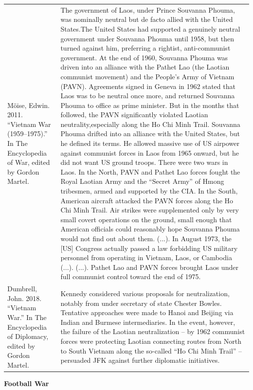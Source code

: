 {\begin{longtable}{p{}p{}}
\\
Möise, Edwin. 2011. “Vietnam War (1959–1975).” In The Encyclopedia of War, edited by Gordon Martel. & The government of Laos, under Prince Souvanna Phouma, was nominally neutral but de facto allied with the United States.The United States had supported a genuinely neutral government under Souvanna Phouma until 1958, but then turned against him, preferring a rightist, anti-communist government. At the end of 1960, Souvanna Phouma was driven into an alliance with the Pathet Lao (the Laotian communist movement) and the People's Army of Vietnam (PAVN). Agreements signed in Geneva in 1962 stated that Laos was to be neutral once more, and returned Souvanna Phouma to office as prime minister. But in the months that followed, the PAVN significantly violated Laotian neutrality,especially along the Ho Chi Minh Trail. Souvanna Phouma drifted into an alliance with the United States, but he defined its terms. He allowed massive use of US airpower against communist forces in Laos from 1965 onward, but he did not want US ground troops.
There were two wars in Laos. In the North, PAVN and Pathet Lao forces fought the Royal Laotian Army and the “Secret Army” of Hmong tribesmen, armed and supported by the CIA. In the South, American aircraft attacked the PAVN forces along the Ho Chi Minh Trail. Air strikes were supplemented only by very small covert operations on the ground, small enough that American officials could reasonably hope Souvanna Phouma would not find out about them. (...).
In August 1973, the [US] Congress actually passed a law forbidding US military personnel from operating in Vietnam, Laos, or Cambodia (...). (...).
Pathet Lao and PAVN forces brought Laos under full communist control toward the end of 1975.

\\
Dumbrell, John. 2018. “Vietnam War.” In The Encyclopedia of Diplomacy, edited by Gordon Martel. & Kennedy considered various proposals for neutralization, notably from under secretary of state Chester Bowles. Tentative approaches were made to Hanoi and Beijing via Indian and Burmese intermediaries. In the event, however, the failure of the Laotian neutralization – by 1962 communist forces were protecting Laotian connecting routes from North to South Vietnam along the so-called “Ho Chi Minh Trail” – persuaded JFK against further diplomatic initiatives.
\\
\end{longtable}}
\clearpage
         \textbf{Football War} 

